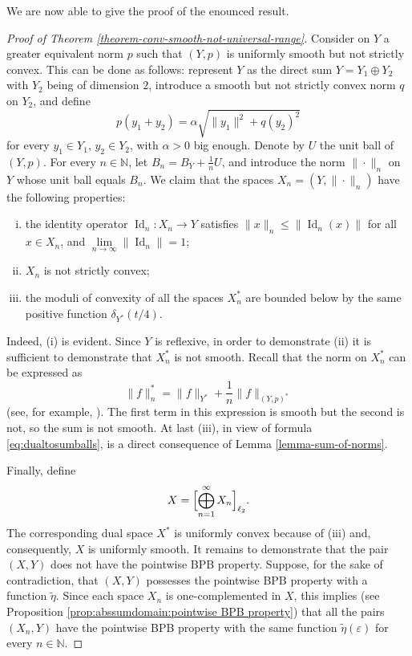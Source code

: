\documentclass[a4paper,10pt]{amsart}
\theoremstyle{plain}
\theoremstyle{definition}
\DeclareMathOperator{\Id}{\mathrm{Id}}
\newcommand{\N}{\mathbb{N}}
\newcommand{\eps}{\varepsilon}
\renewcommand{\leq}{\leqslant}
\begin{document}
We are now able to give the proof of the enounced result.

\begin{proof}[Proof of Theorem \ref{theorem-conv-smooth-not-universal-range}]
Consider on $Y$ a greater equivalent norm $p$ such that $(Y, p)$ is uniformly smooth but not strictly convex. This can be done as follows: represent $Y$ as the direct sum $Y = Y_1\oplus Y_2$ with $Y_2$ being of dimension $2$, introduce a smooth but not strictly convex norm $q$ on $Y_2$, and define
$$
p(y_1 + y_2) = \alpha \sqrt{ \|y_1\|^2 + q(y_2)^2}
$$
for every $y_1 \in Y_1$, $y_2 \in Y_2$, with $\alpha > 0$ big enough.
Denote by $U$ the unit ball of $(Y, p)$.  For every $n\in \N$, let
$B_n = B_{Y} + \frac{1}{n}U$, and introduce the norm $\|\cdot\|_n$ on $Y$ whose unit ball equals $B_n$. We claim that the spaces $X_n =(Y, \|\cdot\|_n)$ have the following properties:
\begin{enumerate}[(i)]
\item  the identity operator $\Id_n : X_n\longrightarrow Y$ satisfies $\|x\|_n \leq \|\Id_n(x)\|$ for all $x \in X_n$, and $\lim\limits_{n\to \infty} \|\Id_n\|=1$;
\item $X_n$ is not strictly convex;
\item the moduli of convexity of all the spaces $X_n^*$ are bounded below by the same positive function $\delta_{Y^*}(t/4)$.
\end{enumerate}

Indeed, (i) is evident. Since $Y$ is reflexive, in order to demonstrate  (ii) it is sufficient to demonstrate that $X_n^*$ is not smooth. Recall that the norm on $X_n^*$ can be expressed as \begin{equation} \label{eq:dualtosumballs}
\|f\|_n^* = \|f\|_{Y^*} + \frac{1}{n}\|f\|_{(Y, p)^*}
\end{equation}
(see, for example, \cite[Lemma 2.1]{KLMW2018}).
The first term in this expression is smooth but the second is not, so the sum is not smooth. At last (iii), in view of formula \eqref{eq:dualtosumballs}, is a direct consequence of Lemma \ref{lemma-sum-of-norms}.

Finally, define
$$
X=\Bigl[\bigoplus_{n=1}^\infty X_n\Bigr]_{\ell_2}.
$$
The corresponding dual space $X^*$ is uniformly convex because of (iii) and, consequently, $X$ is uniformly smooth. It remains to demonstrate that the pair $(X, Y)$ does not have the pointwise BPB property.  Suppose, for the sake of contradiction, that  $(X, Y)$ possesses the pointwise BPB property with a function $\tilde\eta$. Since each space $X_n$ is one-complemented in $X$, this implies (see Proposition \ref{prop:abssumdomain:pointwise BPB property}) that all the pairs $(X_n, Y)$ have the pointwise BPB property with the same function $\tilde\eta(\eps)$ for every $n\in \N$.


\end{proof}
\end{document}

